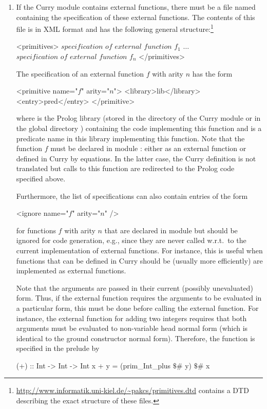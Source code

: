 \begin{enumerate}
\item
If the Curry module  contains external functions,
there must be a file named  containing the
specification of these external functions. The contents of this file
is in XML format and has the following general structure:\footnote{%
\url{http://www.informatik.uni-kiel.de/~pakcs/primitives.dtd} contains a DTD
describing the exact structure of these files.}
\begin{curry}
<primitives>
  $\textit{specification of external function~}f_1$
  $\ldots$
  $\textit{specification of external function~}f_n$
</primitives>
\end{curry}
The specification of an external function $f$
with arity $n$ has the form
\begin{curry}
<primitive name="$f$" arity="$n$">
  <library>lib</library>
  <entry>pred</entry>
</primitive>
\end{curry}
where  is the Prolog library (stored in the directory of the
Curry module or in the global directory
) containing the code implementing this
function and  is a predicate name in this library
implementing this function. Note that the function $f$ must be
declared in module : either as an external function
or defined in Curry by equations. In the latter case,
the Curry definition is not translated but calls to this function
are redirected to the Prolog code specified above.

Furthermore, the list of specifications can also contain entries of the form
\begin{curry}
<ignore name="$f$" arity="$n$" />
\end{curry}
for functions $f$ with arity $n$ that are declared in module 
but should be ignored for code generation, e.g., since they are
never called w.r.t.\ to the current implementation of external functions.
For instance, this is useful when functions that can
be defined in Curry should be (usually more efficiently) are implemented
as external functions.

Note that the arguments are passed in their current (possibly unevaluated) form.
Thus, if the external function requires the arguments to be evaluated
in a particular form, this must be done before calling the external function.
For instance, the external function for adding two integers
requires that both arguments must be evaluated to non-variable head normal form
(which is identical to the ground constructor normal form). Therefore,
the function \ccode{+} is specified in the prelude by
\begin{curry}
(+)   :: Int -> Int -> Int
x + y = (prim_Int_plus $\$$# y) $\$$# x


\end{curry}
\end{enumerate}
